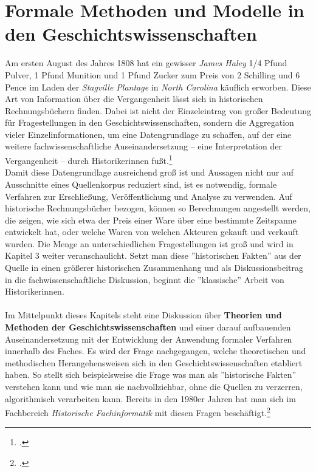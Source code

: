 \documentclass[12pt,a4paper]{article}
\begin{document}
\section{Formale Methoden und Modelle in den Geschichtswissenschaften}
\label{section:FormaleMethoden}

Am ersten August des Jahres 1808 hat ein gewisser \textit{James Haley} 1/4 Pfund Pulver, 1 Pfund Munition und 1 Pfund Zucker zum Preis von 2 Schilling und 6 Pence im Laden der \textit{Stagville Plantage} in \textit{North Carolina} käuflich erworben. Diese Art von Information über die Vergangenheit lässt sich in historischen Rechnungsbüchern finden. Dabei ist nicht der Einzeleintrag von großer Bedeutung für Fragestellungen in den Geschichtswissenschaften, sondern die Aggregation vieler Einzelinformationen, um eine Datengrundlage zu schaffen, auf der eine weitere fachwissenschaftliche Auseinandersetzung -- eine Interpretation der Vergangenheit -- durch Historikerinnen fußt.\footcite[][06.06.2019]{vogeler2015mittelalterliche}
\\
Damit diese Datengrundlage ausreichend groß ist und Aussagen nicht nur auf Ausschnitte eines Quellenkorpus reduziert sind, ist es notwendig, formale Verfahren zur Erschließung, Veröffentlichung und Analyse zu verwenden. Auf historische Rechnungsbücher bezogen, können so Berechnungen angestellt werden, die zeigen, wie sich etwa der Preis einer Ware über eine bestimmte Zeitspanne entwickelt hat, oder welche Waren von welchen Akteuren gekauft und verkauft wurden. Die Menge an unterschiedlichen Fragestellungen ist groß und wird in Kapitel 3 weiter veranschaulicht. Setzt man diese ''historischen Fakten'' aus der Quelle in einen größerer historischen Zusammenhang und als Diskussionsbeitrag in die fachwissenschaftliche Diskussion, beginnt die ''klassische'' Arbeit von Historikerinnen. 
\\
\\
Im Mittelpunkt dieses Kapitels steht eine Diskussion über \textbf{Theorien und Methoden der Geschichtswissenschaften} und einer darauf aufbauenden Auseinandersetzung mit der Entwicklung der Anwendung formaler Verfahren innerhalb des Faches. Es wird der Frage nachgegangen, welche theoretischen und methodischen Herangehensweisen sich in den Geschichtswissenschaften etabliert haben. So stellt sich beispielsweise die Frage was man als ''historische Fakten'' verstehen kann und wie man sie nachvollziehbar, ohne die Quellen zu verzerren, algorithmisch verarbeiten kann. Bereits in den 1980er Jahren hat man sich im Fachbereich \textit{Historische Fachinformatik} mit diesen Fragen beschäftigt.\footcite[][S.260-286]{thaller2017historical}
\end{document}
